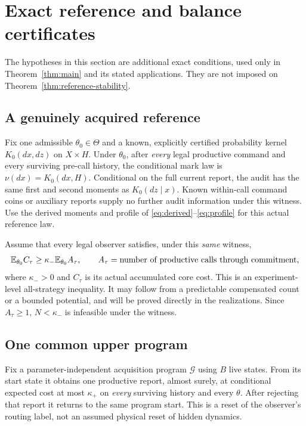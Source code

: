 \section{Exact reference and balance certificates}
\label{sec:exactconditions}
The hypotheses in this section are additional exact conditions, used only in Theorem~\ref{thm:main} and its stated applications. They are not imposed on Theorem~\ref{thm:reference-stability}.
\subsection*{A genuinely acquired reference}
Fix one admissible $\theta_0\in\Theta$ and a known, explicitly certified probability kernel $K_0(dx,dz)$ on $X\times H$. Under $\theta_0$, after \emph{every} legal productive command and every surviving pre-call history, the conditional mark law is $\nu(dx)=K_0(dx,H)$. Conditional on the full current report, the audit has the same first and second moments as $K_0(dz\mid x)$. Known within-call command coins or auxiliary reports supply no further audit information under this witness. Use the derived moments and profile of \eqref{eq:derived}--\eqref{eq:profile} for this actual reference law.

Assume that every legal observer satisfies, under this \emph{same} witness,
\begin{equation}\label{eq:effort}
 \mathbb E_{\theta_0} C_\tau\ge\kappa_-\mathbb E_{\theta_0} A_\tau,
 \qquad A_\tau=\text{number of productive calls through commitment},
\end{equation}
where $\kappa_->0$ and $C_\tau$ is its actual accumulated core cost. This is an experiment-level all-strategy inequality. It may follow from a predictable compensated count or a bounded potential, and will be proved directly in the realizations. Since $A_\tau\ge1$, $N<\kappa_-$ is infeasible under the witness.

\subsection*{One common upper program}
Fix a parameter-independent acquisition program $\mathcal G$ using $B$ live states. From its start state it obtains one productive report, almost surely, at conditional expected cost at most $\kappa_+$ on \emph{every} surviving history and every $\theta$. After rejecting that report it returns to the same program start. This is a reset of the observer's routing label, not an assumed physical reset of hidden dynamics.

